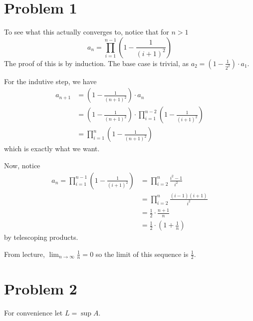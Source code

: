 \documentclass[12pt]{article}
\newcommand{\N}{\mathbb{N}}
\begin{document}
\section{Problem 1}



To see what this actually converges to, notice that for $n > 1$
\[a_n = \prod_{i=1}^{n-1} \left(1-\frac{1}{(i+1)^2}\right)\]
The proof of this is by induction.
The base case is trivial, as $a_2 = \left(1-\frac{1}{2^2}\right) \cdot a_1$.

For the indutive step, we have
\begin{align*}
  a_{n+1}
   & = \left(1-\frac{1}{(n+1)^2}\right) \cdot a_n                                                 \\
   & = \left(1-\frac{1}{(n+1)^2}\right) \cdot  \prod_{i=1}^{n-2} \left(1-\frac{1}{(i+1)^2}\right) \\
   & =  \prod_{i=1}^{n} \left(1-\frac{1}{(n+1)^2}\right)
\end{align*}
which is exactly what we want.

Now, notice
\begin{align*}
  a_n
  =\prod_{i=1}^{n-1} \left(1-\frac{1}{(i+1)^2}\right)
   & = \prod_{i=2}^{n} \frac{i^2-1}{i^2}            \\
   & = \prod_{i=2}^{n} \frac{(i-1)(i+1)}{i^2}       \\
   & = \frac{1}{2} \cdot \frac{n+1}{n}              \\
   & = \frac{1}{2} \cdot \left(1+\frac{1}{n}\right)
\end{align*}
by telescoping products.

From lecture, $\lim_{n \to \infty} \frac{1}{n}=0$ so the limit of this sequence is $\boxed{\frac{1}{2}}$.

\pagebreak

\section{Problem 2}

For convenience let $L=\sup A$.
\end{document}
